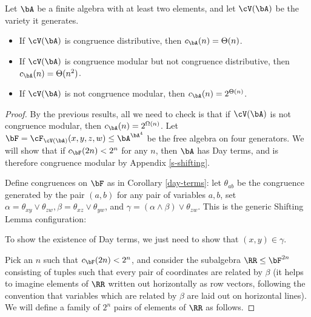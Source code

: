 \begin{thm} Let $\bA$ be a finite algebra with at least two elements, and let $\cV(\bA)$ be the variety it generates.
\begin{itemize}
\item If $\cV(\bA)$ is congruence distributive, then $c_\bA(n) = \Theta(n)$.
\item If $\cV(\bA)$ is congruence modular but not congruence distributive, then $c_\bA(n) = \Theta(n^2)$.
\item If $\cV(\bA)$ is not congruence modular, then $c_\bA(n) = 2^{\Theta(n)}$.
\end{itemize}
\end{thm}
\begin{proof} By the previous results, all we need to check is that if $\cV(\bA)$ is not congruence modular, then $c_\bA(n) = 2^{\Omega(n)}$. Let $\bF = \cF_{\cV(\bA)}(x,y,z,w) \le \bA^{\bA^4}$ be the free algebra on four generators. We will show that if $c_\bF(2n) < 2^n$ for any $n$, then $\bA$ has Day terms, and is therefore congruence modular by Appendix \ref{s-shifting}.

Define congruences on $\bF$ as in Corollary \ref{day-terms}: let $\theta_{ab}$ be the congruence generated by the pair $(a,b)$ for any pair of variables $a,b$, set $\alpha = \theta_{xy} \vee \theta_{zw}, \beta = \theta_{xz} \vee \theta_{yw}$, and $\gamma = (\alpha \wedge \beta) \vee \theta_{zw}$. This is the generic Shifting Lemma configuration:
\begin{center}
\end{center}
To show the existence of Day terms, we just need to show that $(x,y) \in \gamma$.

Pick an $n$ such that $c_{\bF}(2n) < 2^n$, and consider the subalgebra $\RR \le \bF^{2n}$ consisting of tuples such that every pair of coordinates are related by $\beta$ (it helps to imagine elements of $\RR$ written out horizontally as row vectors, following the convention that variables which are related by $\beta$ are laid out on horizontal lines). We will define a family of $2^n$ pairs of elements of $\RR$ as follows.


\end{proof}
